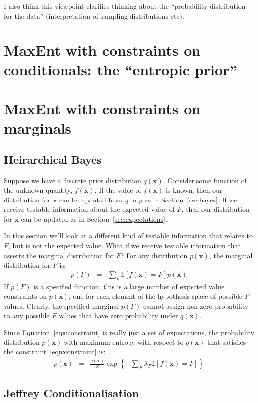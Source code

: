 \documentclass[a4paper, 11pt]{article}
\newcommand{\xx}{\boldsymbol{x}}
\begin{document}
I also think this viewpoint clarifies thinking about the ``probability
distribution for the data'' (interpretation of sampling distributions etc).

\section{MaxEnt with constraints on conditionals: the ``entropic prior''}


\section{MaxEnt with constraints on marginals}
\subsection{Heirarchical Bayes}
Suppose we have a discrete prior distribution $q(\xx)$. Consider some
function of the unknown quantity, $f(\xx)$.
If the value of $f(\xx)$ is known, then our distribution for $\xx$ can
be updated from $q$ to $p$ as in Section~\ref{sec:bayes}.
If we receive testable information
about the expected value of $F$, then our distribution for $\xx$ can
be updated as in Section~\ref{sec:expectations}.

In this section we'll look at a different kind of testable information that
relates to $F$, but is not the expected value. What if we receive testable
information that asserts the marginal distribution for $F$?
For any distribution $p(\xx)$, the marginal distribution for $F$ is:
\begin{eqnarray}
p(F) &=& \sum_{\xx}\mathds{1}\left[f(\xx) = F\right]p(\xx)\label{eqn:constraint}
\end{eqnarray}
If $p(F)$ is a specified function, this is a large number of expected
value constraints on $p(\xx)$, one for each element of the hypothesis space
of possible $F$ values. Clearly, the specified marginal $p(F)$ cannot assign
non-zero probability to any possible $F$ values that have zero probability
under $q(\xx)$.

Since Equation~\ref{eqn:constraint} is really just a set of expectations,
the probability distribution
$p(\xx)$ with maximum entropy with respect to $q(\xx)$ that satisfies the
constraint~\ref{eqn:constraint} is:
\begin{eqnarray}
p(\xx) &=& \frac{q(\xx)}{Z}\exp\left\{-\sum_F \lambda_F \mathds{1}
\left[f(\xx) = F\right]  \right\}
\end{eqnarray}

\subsection{Jeffrey Conditionalisation}
\end{document}
